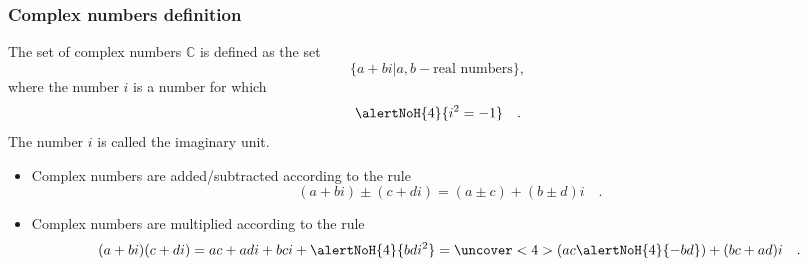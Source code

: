 \begin{frame}
\frametitle{Complex numbers definition}
\begin{definition}The set of complex numbers $\mathbb C$ is defined as the set
\[
\{a+  b i  | a,b-\text{real~numbers}\},
\]
where the number $i$ is a number for which 
\[
\alertNoH{4}{i^2=-1}\quad .
\]
The number $i$ is called the imaginary unit.
\end{definition}
\begin{itemize}
\item<2-> Complex numbers are added/subtracted according to the rule
\[
(a+b i)\pm(c+d i)= (a\pm c) + (b\pm d)i\quad .
\]
\item<3-> Complex numbers are multiplied according to the rule
\[
(a+b i)(c+d i)= a c + a d i+ b ci + \alertNoH{4}{bd i^2}= \uncover<4>{(ac \alertNoH{4}{- bd}) + (bc+ad)i}  \quad .
\]
\end{itemize}

\end{frame}